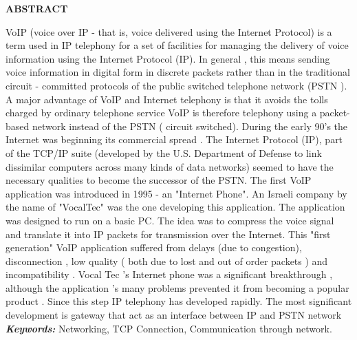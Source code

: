 \thispagestyle{plain}
\begin{center}
    \Large \textbf{\uppercase{Abstract}}
\end{center}

\vspace{3\baselineskip}

\justify
\noindent
VoIP (voice over IP - that is, voice delivered using the Internet Protocol) is a
term used in IP telephony for a set of facilities for managing the delivery of voice
information using the Internet Protocol (IP). In general , this means sending voice
information in digital form in discrete packets rather than in the traditional circuit -
committed protocols of the public switched telephone network (PSTN ). A major
advantage of VoIP and Internet telephony is that it avoids the tolls charged by ordinary
telephone service
VoIP is therefore telephony using a packet-based network instead of the PSTN (
circuit switched).
During the early 90's the Internet was beginning its commercial spread . The
Internet Protocol (IP), part of the TCP/IP suite (developed by the U.S. Department of
Defense to link dissimilar computers across
many kinds of data networks) seemed to have the necessary qualities to become
the successor of the PSTN.
 The first VoIP application was introduced in 1995 - an "Internet Phone". An
Israeli company by the name of "VocalTec" was the one developing this application. The
application was designed to run on a basic PC. The idea was to compress the voice signal
and translate it into IP packets for transmission over the Internet. This "first generation"
VoIP application suffered from delays (due to congestion), disconnection , low quality (
both due to lost and out of order packets ) and incompatibility . Vocal Tec ’s Internet
phone was a significant breakthrough , although the application 's many problems
prevented it from becoming a popular product . Since this step IP telephony has
developed rapidly. The most significant development is gateway that act as an interface
between IP and PSTN network
\\

\textbf{\emph{Keywords:}} Networking, TCP Connection,
Communication through network.\\